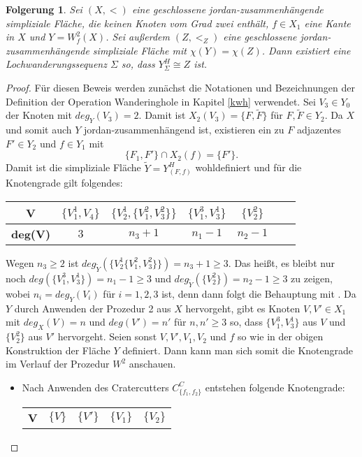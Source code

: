 \documentclass[12pt,titlepage]{article}
\newtheorem{folgerung}{Folgerung}[section]
\begin{document}
\begin{folgerung}
Sei $(X,<)$ eine geschlossene jordan-zusammenhängende simpliziale Fläche, die keinen Knoten vom Grad zwei enthält, $f\in X_1$ eine Kante in $X$ und $Y=W^2_f(X)$. Sei außerdem $(Z,<_Z)$ eine geschlossene jordan-zusammenhängende simpliziale Fläche mit $\chi(Y)=\chi(Z)$. Dann existiert eine Lochwanderungssequenz $\Sigma$ so, dass $Y_{\Sigma}^H \cong Z$ ist.
\end{folgerung}
\begin{proof}
Für diesen Beweis werden zunächst die Notationen und Bezeichnungen der Definition der Operation Wanderinghole in Kapitel \ref{kwh} verwendet.
Sei $V_3\in Y_0$ der Knoten mit $deg_Y(V_3)=2$. Damit ist $X_2(V_3)=\{F,\tilde{F}\}$ für $F,\tilde{F}\in Y_2$. Da $X$ und somit auch $Y$ jordan-zusammenhängend ist, existieren ein zu $F$ adjazentes $F'\in Y_2$ und $f\in Y_1$ mit 
\[
\{F_1,F'\} \cap X_2(f)=\{F'\}.
\]
Damit ist die simpliziale Fläche $\tilde{Y}=Y_{(F,f)}^H$ wohldefiniert und für die Knotengrade gilt folgendes:
\begin{center}
\begin{tabular}{|c|c|c|c|c|c|c|}
\hline
 \textbf{V} & $\{V_1^1,V_4\}$ & $\{V_2^1,\{V_1^2,V_3^2\}\}$ & $\{V_1^3,V_3^1\}$ & $\{V_2^2\} $   \\ 
  \hline
   \textbf{deg(V)} & $3$ & $n_3+1$ & $n_1-1$ & $n_2-1$  \\  
   \hline
 \end{tabular}
 \end{center}
 Wegen $n_3\geq 2$ ist $deg_{\tilde{Y}}(\{V_2^1 \{ V_1^2,V_3^2\}\}) = n_3+1\geq 3 $.
  Das heißt, es bleibt nur noch $deg(\{ V_1^3,V_3^1 \} )=n_1-1\geq 3$
   und $deg_{\tilde{Y}}(\{V_2^2\} )=n_2-1 \geq 3$ zu zeigen, wobei $n_i=deg_{Y}(V_i)$ für $i=1,2,3$ ist, denn dann folgt die Behauptung mit . 
  Da $Y$ durch Anwenden der Prozedur 2 aus $X$ hervorgeht, gibt es Knoten $V,V'\in X_1$ mit $deg_X(V)=n$ und $deg(V')=n'$ für $n,n'\geq 3$ so, dass $\{ V_1^3,V_3^1 \}$ aus $V$ und $\{V_2^2\}$ aus $V'$ hervorgeht. Seien sonst $V,V',V_1,V_2$ und $f$ so wie in der obigen Konstruktion der Fläche $Y$ definiert. Dann kann man sich somit die Knotengrade im Verlauf der Prozedur $W^2$ anschauen.
\begin{itemize}
\item Nach Anwenden des Cratercutters $C_{\{f_1,f_2\}}^C$ entstehen folgende Knotengrade:
\begin{center}
\begin{tabular}{|c|c|c|c|c|}
\hline
 \textbf{V} & $\{V \}$ & $\{V'\}$&$\{V_1\}$&$\{V_2\}$ \\ 

\end{tabular}
\end{center}
\end{itemize}
\end{proof}
\end{document}

